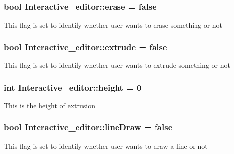 \subsubsection[{\texorpdfstring{erase}{erase}}]{\setlength{\rightskip}{0pt plus 5cm}bool Interactive\+\_\+editor\+::erase = false}\hypertarget{classInteractive__editor_ac2f2f1dfb6c21585d4ed5ed043e41b25}{}\label{classInteractive__editor_ac2f2f1dfb6c21585d4ed5ed043e41b25}
This flag is set to identify whether user wants to erase something or not 
\subsubsection[{\texorpdfstring{extrude}{extrude}}]{\setlength{\rightskip}{0pt plus 5cm}bool Interactive\+\_\+editor\+::extrude = false}\hypertarget{classInteractive__editor_a3e4db48e715e92969ba3ec52ab14ce8d}{}\label{classInteractive__editor_a3e4db48e715e92969ba3ec52ab14ce8d}
This flag is set to identify whether user wants to extrude something or not 
\subsubsection[{\texorpdfstring{height}{height}}]{\setlength{\rightskip}{0pt plus 5cm}int Interactive\+\_\+editor\+::height = 0}\hypertarget{classInteractive__editor_aced5ec777fe62fb280f3668a1c59f9b7}{}\label{classInteractive__editor_aced5ec777fe62fb280f3668a1c59f9b7}
This is the height of extrusion 
\subsubsection[{\texorpdfstring{line\+Draw}{lineDraw}}]{\setlength{\rightskip}{0pt plus 5cm}bool Interactive\+\_\+editor\+::line\+Draw = false}\hypertarget{classInteractive__editor_aa0de8abac09ce2259252fba6c1958e83}{}\label{classInteractive__editor_aa0de8abac09ce2259252fba6c1958e83}
This flag is set to identify whether user wants to draw a line or not 
